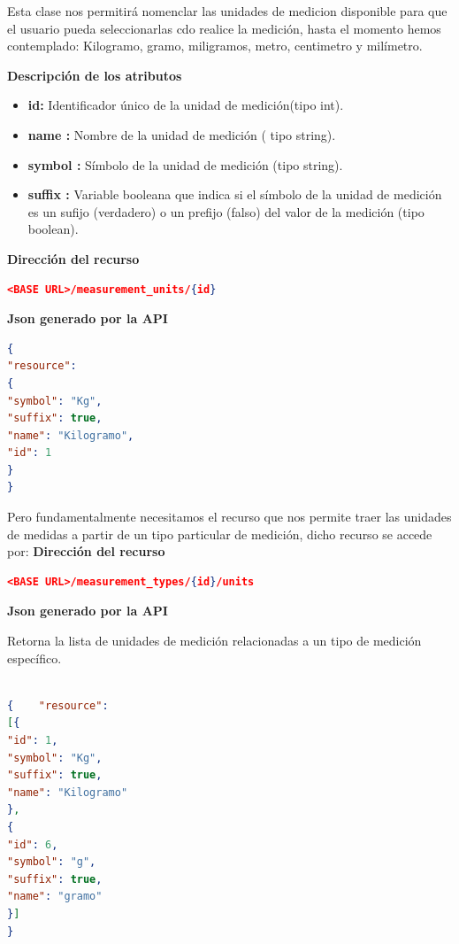 \documentclass[a4paper,12pt]{article}
\begin{document}
Esta clase nos permitirá  nomenclar  las unidades de medicion disponible para que el usuario pueda seleccionarlas cdo realice la medición, hasta el momento hemos contemplado: Kilogramo, gramo, miligramos, metro, centimetro y milímetro.

\textbf{Descripción de los atributos}
\begin{itemize}
	\item \textbf{id:	}	Identificador único de la unidad de medición(tipo int).
	\item \textbf{name :	}	Nombre de la unidad de medición ( tipo string).
	\item \textbf{symbol :}		Símbolo de la unidad de medición (tipo string).
	\item \textbf{suffix :}	Variable booleana que indica si el símbolo de la unidad de medición es un sufijo (verdadero) o un prefijo (falso) del valor de la medición (tipo boolean).
\end{itemize}

\textbf{Dirección del recurso}
\begin{lstlisting}[language=json,firstnumber=1]
<BASE URL>/measurement_units/{id}
\end{lstlisting}

\textbf{Json generado por la API} 

\begin{lstlisting}[language=json,firstnumber=1]
{
"resource": 
{
"symbol": "Kg",
"suffix": true,
"name": "Kilogramo",
"id": 1
}
}
\end{lstlisting}



Pero fundamentalmente necesitamos el recurso que nos permite traer las unidades de medidas a partir de un tipo particular de medición, dicho recurso se accede por:
\textbf{Dirección del recurso}
\begin{lstlisting}[language=json,firstnumber=1]
<BASE URL>/measurement_types/{id}/units
\end{lstlisting}
\textbf{Json generado por la API} 

Retorna la lista de unidades de medición relacionadas a un tipo de medición específico.
\begin{lstlisting}[language=json, caption=Json generado por la api, label=unitPeso]

{    "resource": 
[{
"id": 1,
"symbol": "Kg",
"suffix": true,
"name": "Kilogramo"
},
{
"id": 6,
"symbol": "g",
"suffix": true,
"name": "gramo"
}]
}
\end{lstlisting}
\end{document}
